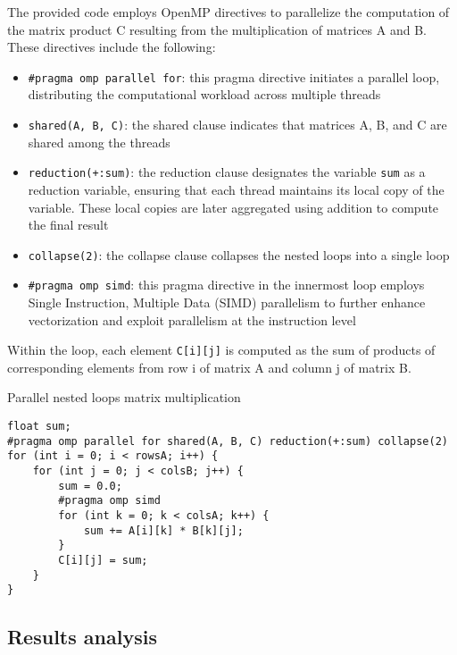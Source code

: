 \documentclass{article}
\begin{document}
The provided code employs OpenMP directives to parallelize the computation of the matrix product C resulting from the multiplication of matrices A and B. These directives include the following:
\begin{itemize}
    \item \texttt{\#pragma omp parallel for}: this pragma directive initiates a parallel loop, distributing the computational workload across multiple threads
    \item \texttt{shared(A, B, C)}: the shared clause indicates that matrices A, B, and C are shared among the threads
    \item \texttt{reduction(+:sum)}: the reduction clause designates the variable \texttt{sum} as a reduction variable, ensuring that each thread maintains its local copy of the variable. These local copies are later aggregated using addition to compute the final result
    \item \texttt{collapse(2)}: the collapse clause collapses the nested loops into a single loop
    \item \texttt{\#pragma omp simd}: this pragma directive in the innermost loop employs Single Instruction, Multiple Data (SIMD) parallelism to further enhance vectorization and exploit parallelism at the instruction level
\end{itemize}
Within the loop, each element \texttt{C[i][j]} is computed as the sum of products of corresponding elements from row i of matrix A and column j of matrix B.\\

\begin{code}
    \caption{\label{code:parallel_multiplication}Parallel nested loops matrix multiplication}
    \begin{verbatim}
float sum;
#pragma omp parallel for shared(A, B, C) reduction(+:sum) collapse(2)
for (int i = 0; i < rowsA; i++) {
    for (int j = 0; j < colsB; j++) {
        sum = 0.0;
        #pragma omp simd 
        for (int k = 0; k < colsA; k++) {
            sum += A[i][k] * B[k][j];
        }
        C[i][j] = sum;
    }
}
    \end{verbatim}
\end{code}

\subsection*{Results analysis}
\end{document}
